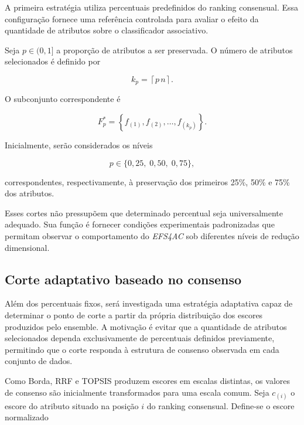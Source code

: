 A primeira estratégia utiliza percentuais predefinidos do ranking consensual.
Essa configuração fornece uma referência controlada para avaliar o efeito da
quantidade de atributos sobre o classificador associativo.

Seja $p\in(0,1]$ a proporção de atributos a ser preservada. O número de
atributos selecionados é definido por

\begin{equation}
    k_p
    =
    \left\lceil
        p\,n
    \right\rceil.
    \label{eq:k-percentual-ac-efs}
\end{equation}

O subconjunto correspondente é

\begin{equation}
    F^{*}_{p}
    =
    \left\{
        f_{(1)},f_{(2)},\ldots,f_{(k_p)}
    \right\}.
    \label{eq:subset-percentual-ac-efs}
\end{equation}

Inicialmente, serão considerados os níveis

\begin{equation}
    p\in\{0{,}25,\;0{,}50,\;0{,}75\},
\end{equation}

correspondentes, respectivamente, à preservação dos primeiros 25\%, 50\% e
75\% dos atributos.

Esses cortes não pressupõem que determinado percentual seja universalmente
adequado. Sua função é fornecer condições experimentais padronizadas que
permitam observar o comportamento do \textit{EFS4AC} sob diferentes níveis
de redução dimensional.


\subsection{Corte adaptativo baseado no consenso}
\label{subsec:ac-efs-corte-adaptativo}

Além dos percentuais fixos, será investigada uma estratégia adaptativa capaz de
determinar o ponto de corte a partir da própria distribuição dos escores
produzidos pelo ensemble. A motivação é evitar que a quantidade de atributos
selecionados dependa exclusivamente de percentuais definidos previamente,
permitindo que o corte responda à estrutura de consenso observada em cada
conjunto de dados.

Como Borda, RRF e TOPSIS produzem escores em escalas distintas, os valores de
consenso são inicialmente transformados para uma escala comum. Seja
$c_{(i)}$ o escore do atributo situado na posição $i$ do ranking consensual.
Define-se o escore normalizado

